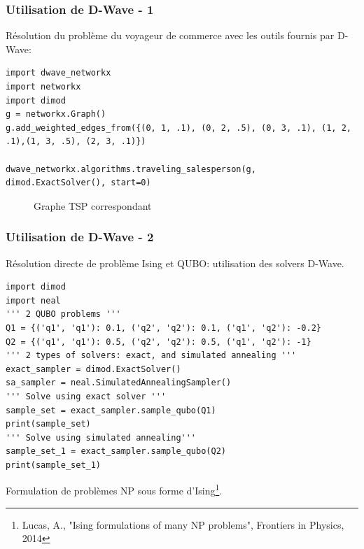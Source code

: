 \documentclass{beamer}
\begin{document}
\begin{frame}[fragile]
    \frametitle{Utilisation de D-Wave - 1}
    Résolution du problème du voyageur de commerce avec les outils fournis par D-Wave:
    \begin{lstlisting}[style=CStyle, basicstyle=\tiny]
import dwave_networkx
import networkx
import dimod
g = networkx.Graph()
g.add_weighted_edges_from({(0, 1, .1), (0, 2, .5), (0, 3, .1), (1, 2, .1),(1, 3, .5), (2, 3, .1)})

dwave_networkx.algorithms.traveling_salesperson(g, dimod.ExactSolver(), start=0)
\end{lstlisting}

\begin{figure}
    \caption{\tiny Graphe TSP correspondant}
\end{figure}

\end{frame}

\begin{frame}[fragile]
    \frametitle{Utilisation de D-Wave - 2}
    Résolution directe de problème Ising et QUBO: utilisation des solvers D-Wave.
    \begin{lstlisting}[style=CStyle, basicstyle=\tiny]
import dimod
import neal
''' 2 QUBO problems '''
Q1 = {('q1', 'q1'): 0.1, ('q2', 'q2'): 0.1, ('q1', 'q2'): -0.2}
Q2 = {('q1', 'q1'): 0.5, ('q2', 'q2'): 0.5, ('q1', 'q2'): -1}
''' 2 types of solvers: exact, and simulated annealing '''
exact_sampler = dimod.ExactSolver()
sa_sampler = neal.SimulatedAnnealingSampler()
''' Solve using exact solver '''
sample_set = exact_sampler.sample_qubo(Q1)
print(sample_set)
''' Solve using simulated annealing'''
sample_set_1 = exact_sampler.sample_qubo(Q2)
print(sample_set_1)

\end{lstlisting}

Formulation de problèmes NP sous forme d'Ising\footnote{Lucas, A., "Ising formulations of many NP problems", Frontiers in Physics, 2014}.
\end{frame}
\end{document}
